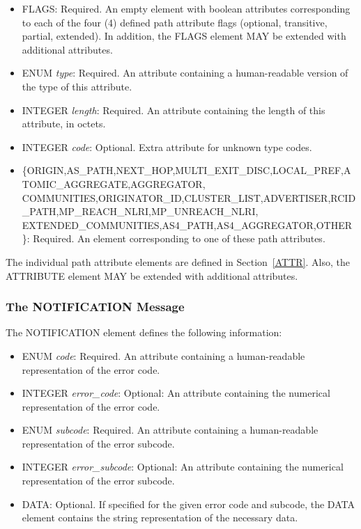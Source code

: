 \documentclass{article}
\begin{document}
\begin{itemize}
\item{FLAGS: Required. An empty element with boolean attributes corresponding to each of the four (4) defined path attribute flags (optional, transitive, partial, extended).  In addition, the FLAGS element MAY be extended with additional attributes.}
\item{ENUM \emph{type}: Required. An attribute containing a human-readable version of the type of this attribute.}
\item{INTEGER \emph{length}: Required. An attribute containing the length of this attribute, in octets.}
\item{INTEGER \emph{code}: Optional. Extra attribute for unknown type codes.}
\item{\{ORIGIN,AS_PATH,NEXT_HOP,MULTI_EXIT_DISC,LOCAL_PREF,ATOMIC_AGGREGATE,AGGREGATOR,
COMMUNITIES,ORIGINATOR_ID,CLUSTER_LIST,ADVERTISER,RCID_PATH,MP_REACH_NLRI,MP_UNREACH_NLRI,
EXTENDED_COMMUNITIES,AS4_PATH,AS4_AGGREGATOR,OTHER\}: Required. An element corresponding to one
of these path attributes.}
\end{itemize}

The individual path attribute elements are defined in Section~\ref{ATTR}.  Also, the ATTRIBUTE element MAY be extended with additional attributes.

\subsubsection{The NOTIFICATION Message}
\label{NOTIFICATION}
The NOTIFICATION element defines the following information:

\begin{itemize}
\item{ENUM \emph{code}: Required. An attribute containing a human-readable representation of the error code.}
\item{INTEGER \emph{error_code}: Optional: An attribute containing the numerical representation of the error code.}
\item{ENUM \emph{subcode}: Required. An attribute containing a human-readable representation of the error subcode.}
\item{INTEGER \emph{error_subcode}: Optional: An attribute containing the numerical representation of the error subcode.}
\item{DATA: Optional. If specified for the given error code and subcode, the DATA element contains the string representation of the necessary data.}
\end{itemize}
\end{document}
